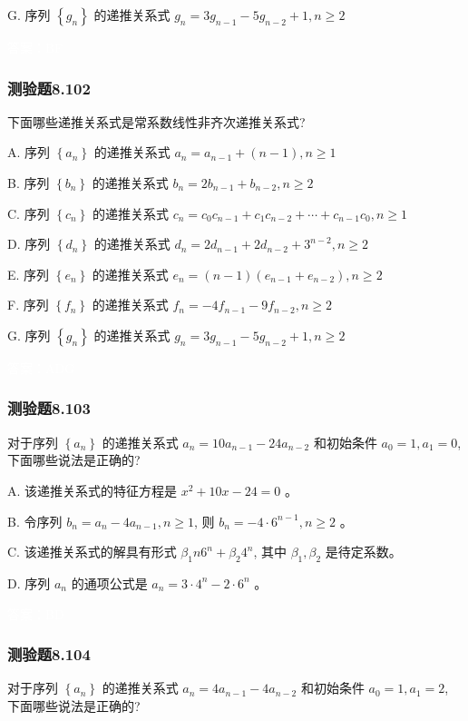 \documentclass[UTF8, heading=true]{ctexart}
\begin{document}
G. 序列 $\left\{g_n\right\}$ 的递推关系式 $g_n=3 g_{n-1}-5 g_{n-2}+1, n \geq 2$

\textcolor{white}{答案：BF}

\subsubsection{测验题8.102}

下面哪些递推关系式是常系数线性非齐次递推关系式?

A. 
序列 $\left\{a_n\right\}$ 的递推关系式 $a_n=a_{n-1}+(n-1), n \geq 1$

B. 
序列 $\left\{b_n\right\}$ 的递推关系式 $b_n=2 b_{n-1}+b_{n-2}, n \geq 2$

C. 
序列 $\left\{c_n\right\}$ 的递推关系式 $c_n=c_0 c_{n-1}+c_1 c_{n-2}+\cdots+c_{n-1} c_0, n \geq 1$

D. 
序列 $\left\{d_n\right\}$ 的递推关系式 $d_n=2 d_{n-1}+2 d_{n-2}+3^{n-2}, n \geq 2$

E. 
序列 $\left\{e_n\right\}$ 的递推关系式 $e_n=(n-1)\left(e_{n-1}+e_{n-2}\right), n \geq 2$

F.
序列 $\left\{f_n\right\}$ 的递推关系式 $f_n=-4 f_{n-1}-9 f_{n-2}, n \geq 2$

G.
序列 $\left\{g_n\right\}$ 的递推关系式 $g_n=3 g_{n-1}-5 g_{n-2}+1, n \geq 2$

\textcolor{white}{答案：ADG}

\subsubsection{测验题8.103}

对于序列 $\left\{a_n\right\}$ 的递推关系式 $a_n=10 a_{n-1}-24 a_{n-2}$ 和初始条件 $a_0=1, a_1=0$, 下面哪些说法是正确的?

A. 
该递推关系式的特征方程是 $x^2+10 x-24=0$ 。

B. 
令序列 $b_n=a_n-4 a_{n-1}, n \geq 1$, 则 $b_n=-4 \cdot 6^{n-1}, n \geq 2$ 。

C. 
该递推关系式的解具有形式 $\beta_1 n 6^n+\beta_2 4^n$, 其中 $\beta_1, \beta_2$ 是待定系数。

D. 
序列 $a_n$ 的通项公式是 $a_n=3 \cdot 4^n-2 \cdot 6^n$ 。

\textcolor{white}{答案：BD}

\subsubsection{测验题8.104}

对于序列 $\left\{a_n\right\}$ 的递推关系式 $a_n=4 a_{n-1}-4 a_{n-2}$ 和初始条件 $a_0=1, a_1=2$, 下面哪些说法是正确的?
\end{document}
